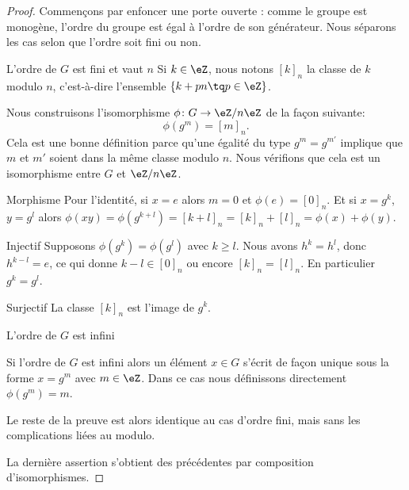\begin{proof}

	Commençons par enfoncer une porte ouverte : comme le groupe est monogène, l'ordre du groupe est égal à l'ordre de son générateur. Nous séparons les cas selon que l'ordre soit fini ou non.

	\begin{subproof}
		\item[L'ordre de \( G\) est fini et vaut \( n\)]
		Si \( k\in\eZ\), nous notons \( [k]_n\) la classe de \( k\) modulo \( n\), c'est-à-dire l'ensemble \( \{ k+pn\tq p\in \eZ \}\).

		Nous construisons l'isomorphisme \( \phi\colon G\to \eZ/n\eZ\) de la façon suivante:
		\begin{equation}
			\phi(g^m)=[m]_n.
		\end{equation}
		Cela est une bonne définition parce qu'une égalité du type \( g^m=g^{m'}\) implique que \( m\) et \( m'\) soient dans la même classe modulo \( n\). Nous vérifions que cela est un isomorphisme entre \( G\) et \( \eZ/n\eZ\).

		\begin{subproof}
			\item[Morphisme]
			Pour l'identité, si \( x=e\) alors \( m=0\) et \( \phi(e)=[0]_n\). Et si \( x=g^k\), \( y=g^l\) alors \( \phi(xy)=\phi(g^{k+l})=[k+l]_n=[k]_n+[l]_n=\phi(x)+\phi(y) \).
			\item[Injectif]
			Supposons \( \phi(g^k)=\phi(g^l)\) avec \( k\geq l\). Nous avons \( h^k=h^l\), donc \( h^{k-l}=e\), ce qui donne \( k-l\in [0]_n\) ou encore \( [k]_n=[l]_n\). En particulier \( g^k=g^l\).
			\item[Surjectif]
			La classe \( [k]_n\) est l'image de \( g^k\).
		\end{subproof}

		\item[L'ordre de \( G\) est infini]

		Si l'ordre de \( G\) est infini alors un élément \( x\in G\) s'écrit de façon unique sous la forme \( x=g^m\) avec \( m\in \eZ\). Dans ce cas nous définissons directement \( \phi(g^m)=m\).

		Le reste de la preuve est alors identique au cas d'ordre fini, mais sans les complications liées au modulo.

	\end{subproof}

	La dernière assertion s'obtient des précédentes par composition d'isomorphismes.

\end{proof}

